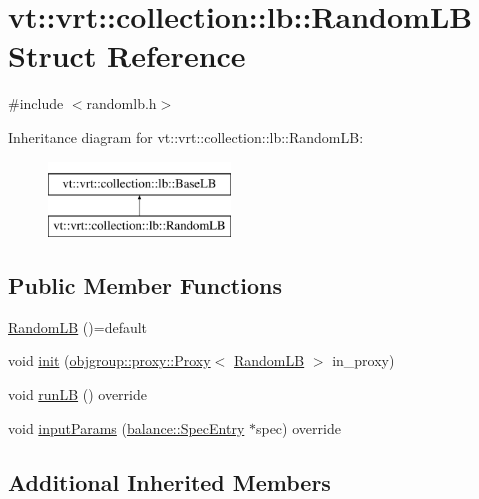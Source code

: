 \hypertarget{structvt_1_1vrt_1_1collection_1_1lb_1_1_random_l_b}{}\section{vt\+:\+:vrt\+:\+:collection\+:\+:lb\+:\+:Random\+LB Struct Reference}
\label{structvt_1_1vrt_1_1collection_1_1lb_1_1_random_l_b}


{\ttfamily \#include $<$randomlb.\+h$>$}

Inheritance diagram for vt\+:\+:vrt\+:\+:collection\+:\+:lb\+:\+:Random\+LB\+:\begin{figure}[H]
\begin{center}
\leavevmode
\includegraphics[height=2.000000cm]{structvt_1_1vrt_1_1collection_1_1lb_1_1_random_l_b}
\end{center}
\end{figure}
\subsection*{Public Member Functions}
\begin{DoxyCompactItemize}
\item 
\hyperlink{structvt_1_1vrt_1_1collection_1_1lb_1_1_random_l_b_ac6bf4ed6fb55fb787478c5f00d68f20c}{Random\+LB} ()=default
\item 
void \hyperlink{structvt_1_1vrt_1_1collection_1_1lb_1_1_random_l_b_a1b9a24043e9a971fc3acb47233028ca8}{init} (\hyperlink{structvt_1_1objgroup_1_1proxy_1_1_proxy}{objgroup\+::proxy\+::\+Proxy}$<$ \hyperlink{structvt_1_1vrt_1_1collection_1_1lb_1_1_random_l_b}{Random\+LB} $>$ in\+\_\+proxy)
\item 
void \hyperlink{structvt_1_1vrt_1_1collection_1_1lb_1_1_random_l_b_a7354965590d0ab010841a2a9086ce7e8}{run\+LB} () override
\item 
void \hyperlink{structvt_1_1vrt_1_1collection_1_1lb_1_1_random_l_b_ae0269a00daa9a3111742d9ea35f5a542}{input\+Params} (\hyperlink{structvt_1_1vrt_1_1collection_1_1balance_1_1_spec_entry}{balance\+::\+Spec\+Entry} $\ast$spec) override
\end{DoxyCompactItemize}
\subsection*{Additional Inherited Members}


